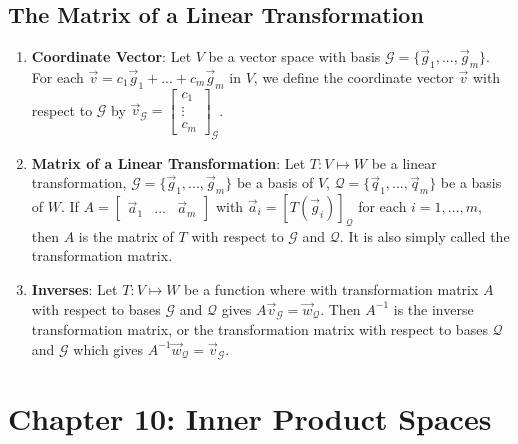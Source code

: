 \documentclass[10pt]{article}
\begin{document}
\subsection{The Matrix of a Linear Transformation}
\begin{enumerate}
\item \textbf{Coordinate Vector}: Let $V$ be a vector space with basis $\mathcal{G} = \lbrace \vec{g}_1,...,\vec{g}_m \rbrace$. For each $\vec{v} = c_1 \vec{g}_1 + ... + c_m \vec{g}_m$ in $V$, we define the coordinate vector $\vec{v}$ with respect to $\mathcal{G}$ by $\vec{v}_{\mathcal{G}} = \begin{bmatrix}
c_1 \\
\vdots \\
c_m
\end{bmatrix}_{\mathcal{G}}$.
\item \textbf{Matrix of a Linear Transformation}: Let $T: V \mapsto W$ be a linear transformation, $\mathcal{G} = \lbrace \vec{g}_1,...,\vec{g}_m \rbrace$ be a basis of $V$, $\mathcal{Q} = \lbrace \vec{q}_1,...,\vec{q}_m \rbrace$ be a basis of $W$. If $A = \begin{bmatrix}
\vec{a}_1 & ... & \vec{a}_m
\end{bmatrix}$ with $\vec{a}_i = [T(\vec{g}_i)]_{\mathcal{Q}}$ for each $i = 1,...,m$, then $A$ is the matrix of $T$ with respect to $\mathcal{G}$ and $\mathcal{Q}$. It is also simply called the transformation matrix.
\item \textbf{Inverses}: Let $T: V \mapsto W$ be a function where with transformation matrix $A$ with respect to bases $\mathcal{G}$ and  $\mathcal{Q}$ gives $A\vec{v}_{\mathcal{G}} = \vec{w}_{\mathcal{Q}}$. Then $A^{-1}$ is the inverse transformation matrix, or the transformation matrix with respect to bases $\mathcal{Q}$ and $\mathcal{G}$ which gives $A^{-1}\vec{w}_{\mathcal{Q}} = \vec{v}_{\mathcal{G}}$.
\end{enumerate}
\section{Chapter 10: Inner Product Spaces}
\end{document}
